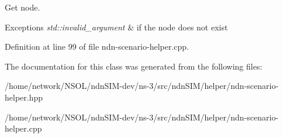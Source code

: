 Get node. 


\begin{DoxyExceptions}{Exceptions}
{\em std\+::invalid\+\_\+argument} & if the node does not exist \\
\hline
\end{DoxyExceptions}


Definition at line 99 of file ndn-\/scenario-\/helper.\+cpp.



The documentation for this class was generated from the following files\+:\begin{DoxyCompactItemize}
\item 
/home/network/\+N\+S\+O\+L/ndn\+S\+I\+M-\/dev/ns-\/3/src/ndn\+S\+I\+M/helper/ndn-\/scenario-\/helper.\+hpp\item 
/home/network/\+N\+S\+O\+L/ndn\+S\+I\+M-\/dev/ns-\/3/src/ndn\+S\+I\+M/helper/ndn-\/scenario-\/helper.\+cpp\end{DoxyCompactItemize}
